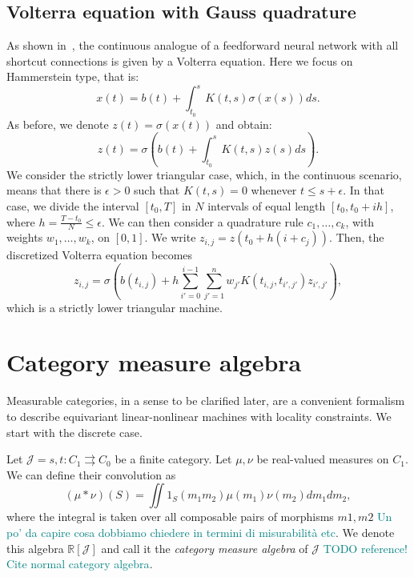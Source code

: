 \documentclass[12pt]{article}
\newcommand{\pietro}[1]{\textcolor{teal}{#1}}
\newcommand{\R}{{\mathbb{R}}}
\newcommand{\JCat}{{\mathcal{J}}}
\begin{document}
\subsection{Volterra equation with Gauss quadrature}

As shown in~\cite{2020arXiv200702777V}, the continuous analogue of a feedforward neural network with all shortcut connections is given by a Volterra equation. Here we focus on Hammerstein type, that is:
\begin{equation*}
    x(t) = b(t) + \int_{t_0}^s K(t, s)\sigma(x(s)) ds.
\end{equation*}
As before, we denote $z(t) = \sigma(x(t))$ and obtain:
\begin{equation*}
    z(t) = \sigma\left(b(t) + \int_{t_0}^s K(t, s)z(s) ds\right).
\end{equation*}
We consider the strictly lower triangular case, which, in the continuous scenario, means that there is $\epsilon > 0$ such that $K(t, s) = 0$ whenever $t \le s + \epsilon$. In that case, we divide the interval $[t_0, T]$ in $N$ intervals of equal length $[t_0, t_0 + ih]$, where $h = \frac{T-t_0}{N} \le \epsilon$.
We can then consider a quadrature rule $c_1,\dots, c_k$, with weights $w_1, \dots, w_k$, on $[0, 1]$. We write $z_{i, j} = z(t_0 + h(i + c_j))$. Then, the discretized Volterra equation becomes
\begin{equation*}
    z_{i, j} = \sigma\left(b(t_{i, j}) + h\sum_{i' = 0}^{i-1} \sum_{j' = 1}^n w_{j'} K(t_{i, j}, t_{i', j'}) z_{i', j'}\right),
\end{equation*}
which is a strictly lower triangular machine.

\section{Category measure algebra}

Measurable categories, in a sense to be clarified later, are a convenient formalism to describe equivariant linear-nonlinear machines with locality constraints. We start with the discrete case.

Let $\JCat = s, t \colon C_1 \rightrightarrows C_0$ be a finite category. Let $\mu, \nu$ be real-valued measures on $C_1$. We can define their convolution as
\begin{equation*}
    (\mu * \nu)(S) = \iint 1_S(m_1m_2) \mu(m_1)\nu(m_2)dm_1dm_2,
\end{equation*}
where the integral is taken over all composable pairs of morphisms $m1, m2$ \pietro{Un po' da capire cosa dobbiamo chiedere in termini di misurabilità etc}.
We denote this algebra $\R[\JCat]$ and call it the {\em category measure algebra} of $\JCat$ \pietro{TODO reference! Cite normal category algebra}.
\end{document}

